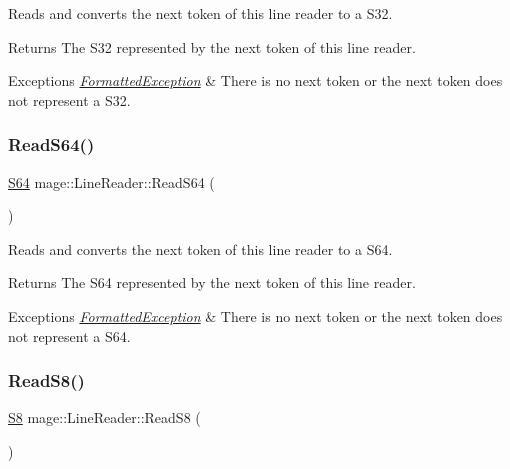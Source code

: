 Reads and converts the next token of this line reader to a {\ttfamily S32}.

\begin{DoxyReturn}{Returns}
The {\ttfamily S32} represented by the next token of this line reader. 
\end{DoxyReturn}

\begin{DoxyExceptions}{Exceptions}
{\em \hyperlink{structmage_1_1_formatted_exception}{Formatted\+Exception}} & There is no next token or the next token does not represent a {\ttfamily S32}. \\
\hline
\end{DoxyExceptions}
\hypertarget{classmage_1_1_line_reader_a8eec39fc74b8708033aa2b937bf4b785}{}\label{classmage_1_1_line_reader_a8eec39fc74b8708033aa2b937bf4b785} 
\subsubsection{\texorpdfstring{Read\+S64()}{ReadS64()}}
{\footnotesize\ttfamily \hyperlink{namespacemage_a38d4d411c173c8978eb356d2412b32dd}{S64} mage\+::\+Line\+Reader\+::\+Read\+S64 (\begin{DoxyParamCaption}{ }\end{DoxyParamCaption})\hspace{0.3cm}{\ttfamily [protected]}}

Reads and converts the next token of this line reader to a {\ttfamily S64}.

\begin{DoxyReturn}{Returns}
The {\ttfamily S64} represented by the next token of this line reader. 
\end{DoxyReturn}

\begin{DoxyExceptions}{Exceptions}
{\em \hyperlink{structmage_1_1_formatted_exception}{Formatted\+Exception}} & There is no next token or the next token does not represent a {\ttfamily S64}. \\
\hline
\end{DoxyExceptions}
\hypertarget{classmage_1_1_line_reader_a39a5e24bb2b416c56a98cabd93efcc73}{}\label{classmage_1_1_line_reader_a39a5e24bb2b416c56a98cabd93efcc73} 
\subsubsection{\texorpdfstring{Read\+S8()}{ReadS8()}}
{\footnotesize\ttfamily \hyperlink{namespacemage_a20766a773cfd6c14d8f2344d4631b89c}{S8} mage\+::\+Line\+Reader\+::\+Read\+S8 (\begin{DoxyParamCaption}{ }\end{DoxyParamCaption})\hspace{0.3cm}{\ttfamily [protected]}}

